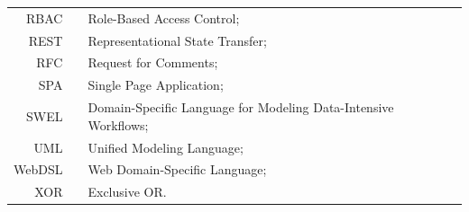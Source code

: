 \begin{center}
\begin{tabular}[t]{rp{3mm}p{12cm}}
        RBAC & & Role-Based Access Control;\\
        REST & & Representational State Transfer;\\
        RFC & & Request for Comments;\\
        SPA & & Single Page Application;\\
        SWEL & & Domain-Specific Language for Modeling Data-Intensive Workflows;\\
        UML & & Unified Modeling Language;\\
        WebDSL & & Web Domain-Specific Language;\\
        XOR & & Exclusive OR.\\
    \end{tabular}
\end{center}
